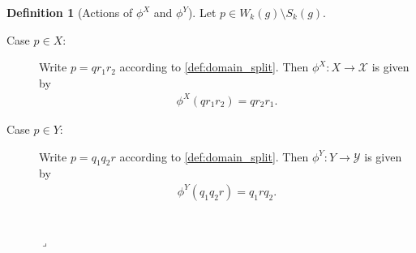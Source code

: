 \documentclass[11pt]{article}
\newcommand{\lrcornerqed}[0]{}
\renewcommand{\lrcornerqed}[0]{\hfill $\lrcorner$} %
\newcommand{\lrcornerqedequation}[0]{
        \\[-3.4em]
        \phantom{.}
        \lrcornerqed
        \\[-0.3em]
        }
\theoremstyle{definition} %
\newtheorem{definition}[thm]{Definition}
\numberwithin{equation}{section}
\begin{document}
\begin{definition}[Actions of $\phi^X$ and $\phi^Y$]
\label{def:phi}
Let $p \in W_k(g) \setminus S_k(g)$.
    \begin{description}

        \item[Case $p \in X$:]
            Write $p = q r_1 r_2$ according to \cref{def:domain_split}. Then $\phi^X: X \to \mathcal{X}$ is given by
            \begin{align}
                \phi^X(q r_1 r_2) = q r_2 r_1.
            \end{align}
    
        \item[Case $p \in Y$:]
            Write $p = q_1 q_2 r$ according to \cref{def:domain_split}. Then $\phi^Y: Y \to \mathcal{Y}$ is given by
            \begin{align}
                \phi^Y(q_1 q_2 r) = q_1 r q_2. 
            \end{align}
            \lrcornerqedequation
    \end{description}
\end{definition}
\end{document}
